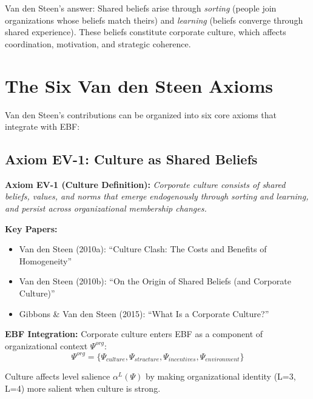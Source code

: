 Van den Steen's answer: Shared beliefs arise through \textit{sorting} (people
join organizations whose beliefs match theirs) and \textit{learning} (beliefs
converge through shared experience). These beliefs constitute corporate culture,
which affects coordination, motivation, and strategic coherence.

\section{The Six Van den Steen Axioms}

Van den Steen's contributions can be organized into six core axioms that
integrate with EBF:

\subsection{Axiom EV-1: Culture as Shared Beliefs}

\begin{tcolorbox}[colback=blue!5!white, colframe=blue!75!black]
\textbf{Axiom EV-1 (Culture Definition):}
\textit{Corporate culture consists of shared beliefs, values, and norms that
emerge endogenously through sorting and learning, and persist across
organizational membership changes.}
\end{tcolorbox}

\textbf{Key Papers:}
\begin{itemize}[nosep]
    \item Van den Steen (2010a): ``Culture Clash: The Costs and Benefits of Homogeneity''
    \item Van den Steen (2010b): ``On the Origin of Shared Beliefs (and Corporate Culture)''
    \item Gibbons \& Van den Steen (2015): ``What Is a Corporate Culture?''
\end{itemize}

\textbf{EBF Integration:}
Corporate culture enters EBF as a component of organizational context $\Psi^{org}$:
\begin{equation}
\Psi^{org} = \{\Psi_{culture}, \Psi_{structure}, \Psi_{incentives}, \Psi_{environment}\}
\end{equation}

Culture affects level salience $\alpha^L(\Psi)$ by making organizational identity
(L=3, L=4) more salient when culture is strong.

